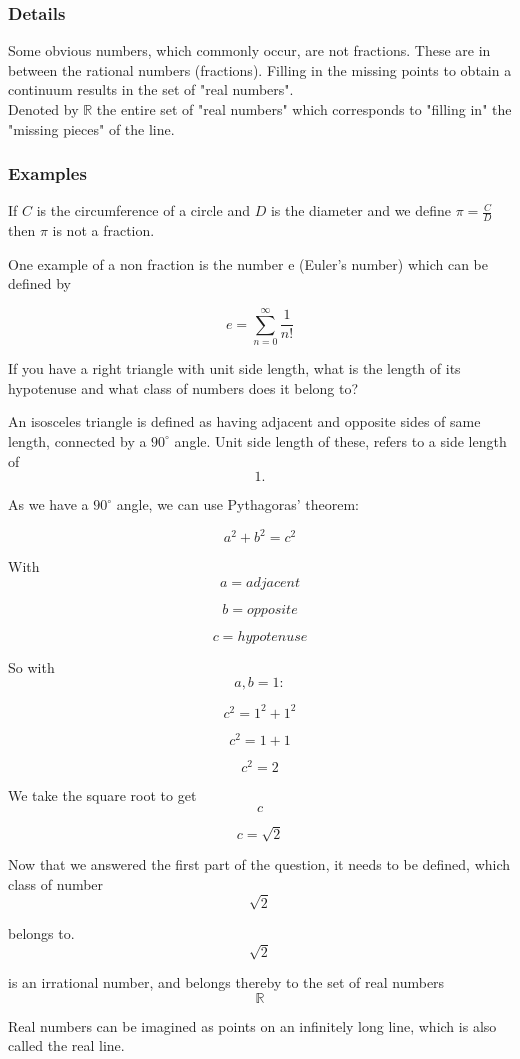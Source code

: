 \documentclass[12pt,a4paper]{article}
\theoremstyle{regla}
\theoremstyle{remark}
\theoremstyle{definition}
\theoremstyle{nonumberbreak}
\begin{document}
\subsubsection{Details}
Some obvious numbers, which commonly occur, are not fractions. These are in between the rational numbers (fractions).  Filling in the missing points to obtain a continuum results in the set of "real numbers".\\

Denoted by $\mathbb{R}$ the entire set of "real numbers"  which corresponds to "filling in"  the "missing pieces"  of the line. 

\subsubsection{Examples}

\begin{xmpl}
If $C$ is the circumference of a circle and $D$ is the diameter and we define $\pi=\frac{C}{D}$ then $\pi$ is not a fraction.
\end{xmpl}


\begin{xmpl}
One example of a non fraction is the number e (Euler's number) which can be defined by   

$$e = \sum_{n=0}^{\infty }\frac{1}{n!}$$
\end{xmpl}
\begin{xmpl}

If you have a right triangle with unit side length, what is the length of its hypotenuse and what class of numbers does it belong to?

An isosceles triangle is defined as having adjacent and opposite sides of same length, connected by a 
$90^{\circ}$ angle.
Unit side length of these, refers to a side length of $$1.$$
 
As we have a $90^{\circ}$ angle, we can use Pythagoras' theorem:

$$a^2+b^2=c^2$$

With
$$a=adjacent$$

$$b=opposite$$

$$c=hypotenuse$$

So with $$a,b=1:$$

$$c^2=1^2+1^2$$

$$c^2=1+1$$

$$c^2=2$$

We take the square root to get $$c$$

$$c=\sqrt{2}$$

Now that we answered the first part of the question, it needs to be defined, which class of number $$\sqrt{2}$$

belongs to. $$\sqrt{2}$$

is an irrational number, and belongs thereby to the set of real numbers $$\mathbb{R}$$

Real numbers can be imagined as points on an infinitely long line, which is also called the real line.
\end{xmpl}
\end{document}
